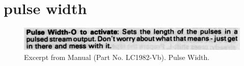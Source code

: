 \chapter{pulse width} 
\label{sec:pulse_width}
\lstset{style=6502Style}

\begin{figure}[H]
    \centering
    \begin{adjustbox}{width=10.5cm,margin=0cm}
      \includegraphics[width=12cm]{src/pulsewidth/pulsewidth.png}%
    \end{adjustbox}
    \caption{
      Excerpt from Manual (Part No. LC1982-Vb). Pulse Width.
      }
\end{figure}

